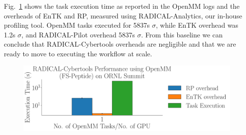 \documentclass[conference,final]{IEEEtran}
\begin{document}
Fig.~\ref{fig:single_openmm} shows the task execution time as reported in the
OpenMM logs and the overheads of EnTK and RP, measured using
RADICAL-Analytics, our in-house profiling tool. OpenMM tasks executed for
5837s $\sigma$, while EnTK overhead was 1.2s $\sigma$, and
RADICAL-Pilot overhead 5837s $\sigma$. From this baseline we can
conclude that RADICAL-Cybertools overheads are negligible and that we are
ready to move to executing the workflow at scale.

\begin{figure}
    \centering
    \includegraphics[width=.8\textwidth]{single_openmm}
    \caption{}
    \label{fig:single_openmm}
\end{figure}



\end{document}
